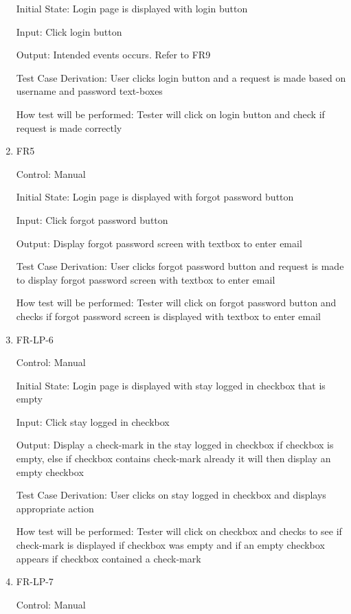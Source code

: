 \documentclass[12pt, titlepage]{article}
\begin{document}
\begin{enumerate}
Initial State: Login page is displayed with login button
					
Input: Click login button
					
Output: Intended events occurs. Refer to FR9

Test Case Derivation: User clicks login button and a request is made based on username and password text-boxes

How test will be performed: Tester will click on login button and check if request is made correctly

\item{FR5\\}

Control: Manual
					
Initial State: Login page is displayed with forgot password button
					
Input: Click forgot password button
					
Output: Display forgot password screen with textbox to enter email

Test Case Derivation: User clicks forgot password button and request is made to display forgot password screen with textbox to enter email

How test will be performed: Tester will click on forgot password button and checks if forgot password screen is displayed with textbox to enter email

\item{FR-LP-6\\}

Control: Manual
					
Initial State: Login page is displayed with stay logged in checkbox that is empty
					
Input: Click stay logged in checkbox
					
Output: Display a check-mark in the stay logged in checkbox if checkbox is empty, else if checkbox contains check-mark already it will then display an empty checkbox

Test Case Derivation: User clicks on stay logged in checkbox and displays appropriate action

How test will be performed: Tester will click on checkbox and checks to see if check-mark is displayed if checkbox was empty and if an empty checkbox appears if checkbox contained a check-mark

\item{FR-LP-7\\}

Control: Manual
					

\end{enumerate}
\end{document}
